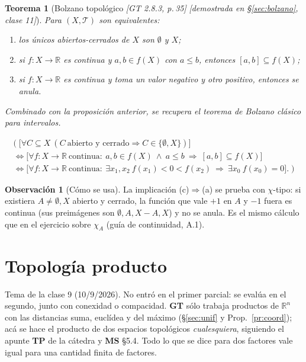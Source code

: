 \documentclass[11pt,a4paper]{article}
\newcommand{\lgc}[1]{\par\vspace{-3pt}\begin{gather*}\big(\;#1\;\big)\end{gather*}\vspace{-6pt}}
\theoremstyle{definition}
\newtheorem{observacion}[definicion]{Observación}
\theoremstyle{plain}
\newtheorem{teorema}[definicion]{Teorema}
\newcommand{\fnt}[1]{{\normalfont\small\itshape\color{gray!150!black}[#1]}}
\newcommand{\R}{\mathbb{R}}
\newcommand{\tp}{\mathcal{T}}
\begin{document}
\begin{teorema}[Bolzano topológico \fnt{GT 2.8.3, p.\,35} \fnt{demostrada en \S\ref{sec:bolzano}, clase 11}]
Para $(X,\tp)$ son equivalentes:
\begin{enumerate}[label=(\alph*),leftmargin=2.2em,itemsep=0pt]
\item los únicos abiertos-cerrados de $X$ son $\emptyset$ y $X$;
\item si $f:X\to\R$ es continua y $a,b\in f(X)$ con $a\le b$, entonces $[a,b]\subseteq f(X)$;
\item si $f:X\to\R$ es continua y toma un valor negativo y otro positivo, entonces se anula.
\end{enumerate}
Combinado con la proposición anterior, se recupera el teorema de Bolzano clásico para intervalos.
\lgc{\big[\forall C\subseteq X\ (C\ \text{abierto y cerrado}\Rightarrow C\in\{\emptyset,X\})\big]\\
\iff \big[\forall f:X\to\R\ \text{continua}:\ a,b\in f(X)\ \wedge\ a\le b\ \Rightarrow\ [a,b]\subseteq f(X)\big]\\
\iff \big[\forall f:X\to\R\ \text{continua}:\ \exists x_1,x_2\ f(x_1)<0<f(x_2)\ \Rightarrow\ \exists x_0\ f(x_0)=0\big].}
\end{teorema}

\begin{observacion}[Cómo se usa]
La implicación (c)$\Rightarrow$(a) se prueba con $\chi$-tipo: si existiera $A\ne\emptyset,X$ abierto y cerrado, la función que vale $+1$ en $A$ y $-1$ fuera es continua (sus preimágenes son $\emptyset,A,X-A,X$) y no se anula. Es el mismo cálculo que en el ejercicio sobre $\chi_A$ (guía de continuidad, A.1).
\end{observacion}

\section{Topología producto}\label{sec:prod}

\noindent Tema de la clase 9 (10/9/2026). No entró en el primer parcial: se evalúa en el segundo, junto con conexidad o compacidad. \textbf{GT} sólo trabaja productos de $\R^n$ con las distancias suma, euclídea y del máximo (\S\ref{sec:unif} y Prop.~\ref{pr:coord}); acá se hace el producto de dos espacios topológicos \emph{cualesquiera}, siguiendo el apunte \textbf{TP} de la cátedra y \textbf{MS} \S5.4. Todo lo que se dice para dos factores vale igual para una cantidad finita de factores.
\end{document}
